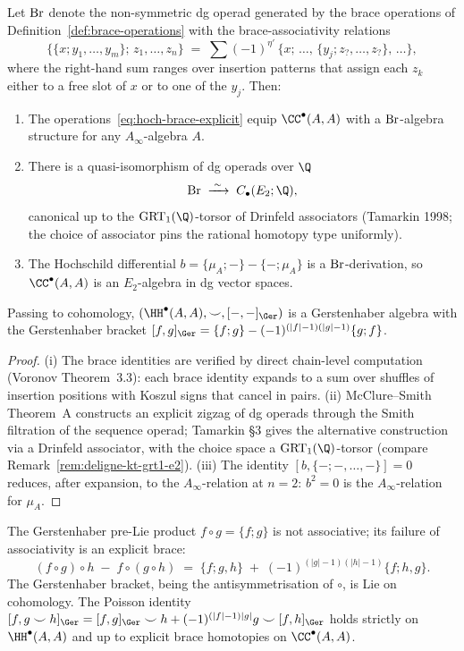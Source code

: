 \begin{theorem}[Deligne at $n = 2$: brace model]
\label{thm:deligne-n2-brace-model}
Let $\mathrm{Br}$ denote the non-symmetric dg operad generated by the brace operations of Definition~\ref{def:brace-operations} with the brace-associativity relations
\[
 \bigl\{\{x; y_1, \ldots, y_m\};\, z_1, \ldots, z_n\bigr\}
 \;=\;
 \sum (-1)^{\eta'}\, \bigl\{x;\, \ldots,\, \{y_j; z_?, \ldots, z_?\},\, \ldots\bigr\},
\]
where the right-hand sum ranges over insertion patterns that assign each $z_k$ either to a free slot of $x$ or to one of the $y_j$. Then:
\begin{enumerate}[label=\textup{(\roman*)}]
\item The operations~\eqref{eq:hoch-brace-explicit} equip $\CC^\bullet(A,A)$ with a $\mathrm{Br}$-algebra structure for any $A_\infty$-algebra $A$.
\item There is a quasi-isomorphism of dg operads over $\Q$
\[
 \Br \;\xrightarrow{\;\sim\;}\; C_\bullet(E_2;\Q),
\]
canonical up to the $\mathrm{GRT}_1(\Q)$-torsor of Drinfeld associators (Tamarkin 1998; the choice of associator pins the rational homotopy type uniformly).
\item The Hochschild differential $b = \{\mu_A;-\} - \{-;\mu_A\}$ is a $\mathrm{Br}$-derivation, so $\CC^\bullet(A,A)$ is an $E_2$-algebra in dg vector spaces.
\end{enumerate}
Passing to cohomology, $(\HH^\bullet(A,A), \smile, [-,-]_\Ger)$ is a Gerstenhaber algebra with the Gerstenhaber bracket $[f,g]_\Ger = \{f;g\} - (-1)^{(|f|-1)(|g|-1)} \{g;f\}$.
\end{theorem}

\begin{proof}
(i) The brace identities are verified by direct chain-level computation (Voronov \cite{VoronovHomotopyGer} Theorem~3.3): each brace identity expands to a sum over shuffles of insertion positions with Koszul signs that cancel in pairs. (ii) McClure--Smith \cite{McClureSmithDeligne} Theorem~A constructs an explicit zigzag of dg operads through the Smith filtration of the sequence operad; Tamarkin \cite{TamarkinAnotherProof} \S3 gives the alternative construction via a Drinfeld associator, with the choice space a $\mathrm{GRT}_1(\Q)$-torsor (compare Remark~\ref{rem:deligne-kt-grt1-e2}). (iii) The identity $[b, \{-;-, \ldots, -\}] = 0$ reduces, after expansion, to the $A_\infty$-relation at $n = 2$: $b^2 = 0$ is the $A_\infty$-relation for $\mu_A$.
\end{proof}

\begin{remark}
\label{rem:gerstenhaber-pre-lie}
The Gerstenhaber pre-Lie product $f \circ g = \{f;g\}$ is not associative; its failure of associativity is an explicit brace:
\[
 (f \circ g) \circ h \;-\; f \circ (g \circ h)
 \;=\; \{f; g, h\} \;+\; (-1)^{(|g|-1)(|h|-1)} \{f; h, g\}.
\]
The Gerstenhaber bracket, being the antisymmetrisation of $\circ$, is Lie on cohomology. The Poisson identity $[f, g \smile h]_\Ger = [f,g]_\Ger \smile h + (-1)^{(|f|-1)|g|} g \smile [f,h]_\Ger$ holds strictly on $\HH^\bullet(A,A)$ and up to explicit brace homotopies on $\CC^\bullet(A,A)$.
\end{remark}

